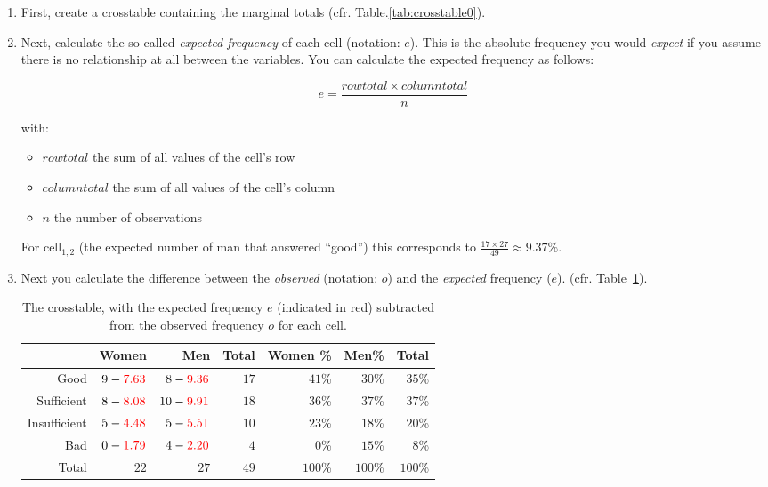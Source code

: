\begin{enumerate}
  \item First, create a crosstable containing the marginal totals (cfr. Table.\ref{tab:crosstable0}).
  \item Next, calculate the so-called \emph{expected frequency} of each cell (notation: $e$). This is the absolute frequency you would \emph{expect} if you assume there is no relationship at all between the variables. You can calculate the expected frequency as follows:
  
  \begin{equation}
      e = \frac{row total \times column total}{n}
  \end{equation}

  with:

  \begin{itemize}
      \item $row total$ the sum of all values of the cell's row
      \item $column total$ the sum of all values of the cell's column
      \item $n$ the number of observations
  \end{itemize}

  For cell$_{1,2}$ (the expected number of man that answered ``good'') this corresponds to $\frac{17 \times 27}{49} \approx 9.37\%$.

  \item Next you calculate the difference between the \emph{observed} (notation: $o$) and the \emph{expected} frequency ($e$). (cfr. Table~\ref{tab:crosstable2}).

  \begin{table} \centering
    \begin{tabular}{@{}rrrrrrr@{}}
      \toprule
                &                       Women &                          Men &  Total & Women \% &   Men\% &   Total \\
      \midrule
           Good &  $9 -\textcolor{red}{7.63}$ &  $8 - \textcolor{red}{9.36}$ &   $17$ &   $41$\% &  $30$\% &  $35$\% \\
     Sufficient & $8 - \textcolor{red}{8.08}$ & $10 - \textcolor{red}{9.91}$ &   $18$ &   $36$\% &  $37$\% &  $37$\% \\
   Insufficient & $5 - \textcolor{red}{4.48}$ &  $5 - \textcolor{red}{5.51}$ &   $10$ &   $23$\% &  $18$\% &  $20$\% \\
            Bad & $0 - \textcolor{red}{1.79}$ &  $4 - \textcolor{red}{2.20}$ &    $4$ &    $0$\% &  $15$\% &   $8$\% \\
          Total &                        $22$ &                         $27$ &   $49$ &  $100$\% & $100$\% & $100$\% \\
    \bottomrule
    \end{tabular}
    \caption{The crosstable, with the expected frequency $e$ (indicated in red) subtracted from the observed frequency $o$ for each cell.}
    \label{tab:crosstable2}
  \end{table}


\end{enumerate}
